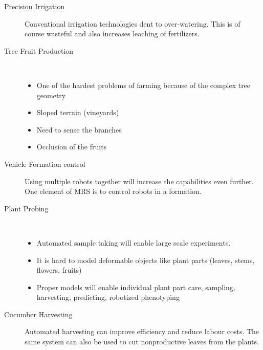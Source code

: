 \begin{description}
        \item[Precision Irrigation] Conventional irrigation technologies dent to over-watering. 
        This is of course wasteful and also increases leaching of fertilizers.
        \item[Tree Fruit Production] \
        \begin{itemize}
            \item One of the hardest problems of farming because of the complex tree geometry
            \item Sloped terrain (vineyards)
            \item Need to sense the branches
            \item Occlusion of the fruits
        \end{itemize}
        \item[Vehicle Formation control] Using multiple robots together will increase the capabilities even further. One element of MRS is to control robots in a formation.
        \item[Plant Probing] \
        \begin{itemize}
            \item Automated sample taking will enable large scale experiments.
            \item It is hard to model deformable objects like plant parts (leaves, stems, flowers, fruits)
            \item Proper models will enable individual plant part care, sampling, harvesting, predicting, robotized phenotyping
        \end{itemize} 
        \item[Cucumber Harvesting] Automated harvesting can improve efficiency and reduce labour costs. The same system can also be used to cut nonproductive leaves from the plants.
    
    \end{description} 
